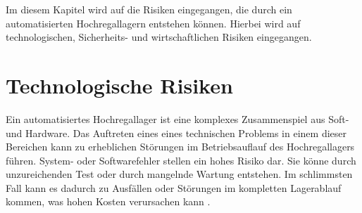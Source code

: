 %
%
%
Im diesem Kapitel wird auf die Risiken eingegangen, die durch ein automatisierten Hochregallagern entstehen können.
Hierbei wird auf technologischen, Sicherheits- und  wirtschaftlichen Risiken eingegangen.
\section{Technologische Risiken}
Ein automatisiertes Hochregallager ist eine komplexes Zusammenspiel aus Soft- und Hardware. Das Auftreten eines eines technischen Problems in einem dieser Bereichen kann zu erheblichen Störungen im Betriebsauflauf des Hochregallagers führen.
System- oder Softwarefehler stellen ein hohes Risiko dar. Sie könne durch unzureichenden Test oder durch mangelnde Wartung entstehen. Im schlimmsten Fall kann es dadurch zu Ausfällen oder Störungen im kompletten Lagerablauf kommen, was hohen Kosten verursachen kann \autocite{duerr2021}.
